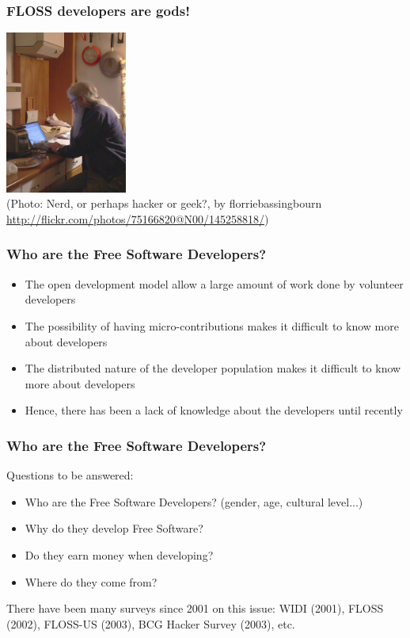 \documentclass{beamer}
\begin{document}
\begin{frame}
\frametitle{FLOSS developers are gods!}

\begin{center}
\includegraphics[width=4cm]{figs/hacker.jpg} \\
(Photo: Nerd, or perhaps hacker or geek?, by florriebassingbourn\\
\url{http://flickr.com/photos/75166820@N00/145258818/})
\end{center}

\end{frame}

\begin{frame}
\frametitle{Who are the Free Software Developers?}

\begin{itemize}
\item The open development model allow a large amount of work done by volunteer
developers
\item The possibility of having micro-contributions makes it difficult to know
more about developers
\item The distributed nature of the developer population makes it difficult to
know more about developers
\item Hence, there has been a lack of knowledge about the developers until
recently
\end{itemize}

\end{frame}


\begin{frame}
\frametitle{Who are the Free Software Developers?}

Questions to be answered:

\begin{itemize}
\item Who are the Free Software Developers? (gender, age, cultural level...)
\item Why do they develop Free Software?
\item Do they earn money when developing?
\item Where do they come from?
\end{itemize}

There have been many surveys since 2001 on this issue: WIDI (2001), FLOSS
(2002), FLOSS-US (2003), BCG Hacker Survey (2003), etc.

\end{frame}
\end{document}
